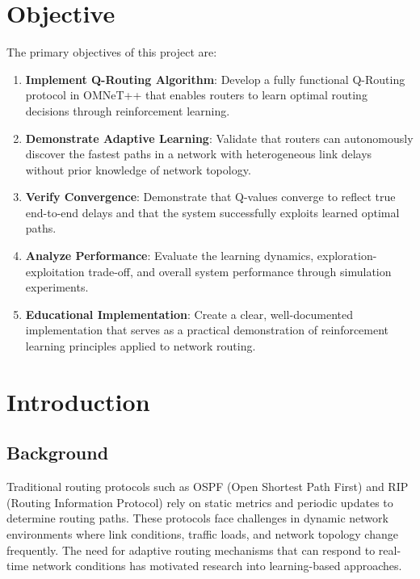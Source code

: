 \documentclass[12pt,a4paper]{article}
\begin{document}
\maketitle

\section{Objective}

The primary objectives of this project are:

\begin{enumerate}
    \item \textbf{Implement Q-Routing Algorithm}: Develop a fully functional Q-Routing protocol in OMNeT++ that enables routers to learn optimal routing decisions through reinforcement learning.
    
    \item \textbf{Demonstrate Adaptive Learning}: Validate that routers can autonomously discover the fastest paths in a network with heterogeneous link delays without prior knowledge of network topology.
    
    \item \textbf{Verify Convergence}: Demonstrate that Q-values converge to reflect true end-to-end delays and that the system successfully exploits learned optimal paths.
    
    \item \textbf{Analyze Performance}: Evaluate the learning dynamics, exploration-exploitation trade-off, and overall system performance through simulation experiments.
    
    \item \textbf{Educational Implementation}: Create a clear, well-documented implementation that serves as a practical demonstration of reinforcement learning principles applied to network routing.
\end{enumerate}

\section{Introduction}

\subsection{Background}

Traditional routing protocols such as OSPF (Open Shortest Path First) and RIP (Routing Information Protocol) rely on static metrics and periodic updates to determine routing paths. These protocols face challenges in dynamic network environments where link conditions, traffic loads, and network topology change frequently. The need for adaptive routing mechanisms that can respond to real-time network conditions has motivated research into learning-based approaches.
\end{document}
